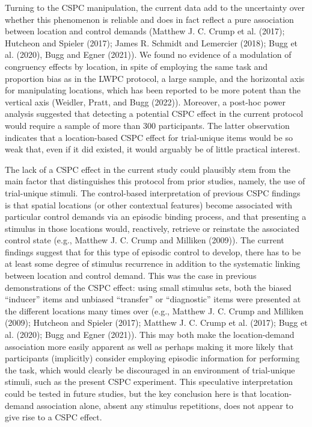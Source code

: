 \documentclass[
  ,man,floatsintext]{apa6}
\begin{document}
Turning to the CSPC manipulation, the current data add to the uncertainty over whether this phenomenon is reliable and does in fact reflect a pure association between location and control demands (Matthew J. C. Crump et al. (2017); Hutcheon and Spieler (2017); James R. Schmidt and Lemercier (2018); Bugg et al. (2020), Bugg and Egner (2021)). We found no evidence of a modulation of congruency effects by location, in spite of employing the same task and proportion bias as in the LWPC protocol, a large sample, and the horizontal axis for manipulating locations, which has been reported to be more potent than the vertical axis (Weidler, Pratt, and Bugg (2022)). Moreover, a post-hoc power analysis suggested that detecting a potential CSPC effect in the current protocol would require a sample of more than 300 participants. The latter observation indicates that a location-based CSPC effect for trial-unique items would be so weak that, even if it did existed, it would arguably be of little practical interest.

The lack of a CSPC effect in the current study could plausibly stem from the main factor that distinguishes this protocol from prior studies, namely, the use of trial-unique stimuli. The control-based interpretation of previous CSPC findings is that spatial locations (or other contextual features) become associated with particular control demands via an episodic binding process, and that presenting a stimulus in those locations would, reactively, retrieve or reinstate the associated control state (e.g., Matthew J. C. Crump and Milliken (2009)). The current findings suggest that for this type of episodic control to develop, there has to be at least some degree of stimulus recurrence in addition to the systematic linking between location and control demand. This was the case in previous demonstrations of the CSPC effect: using small stimulus sets, both the biased ``inducer'' items and unbiased ``transfer'' or ``diagnostic'' items were presented at the different locations many times over (e.g., Matthew J. C. Crump and Milliken (2009); Hutcheon and Spieler (2017); Matthew J. C. Crump et al. (2017); Bugg et al. (2020); Bugg and Egner (2021)). This may both make the location-demand association more easily apparent as well as perhaps making it more likely that participants (implicitly) consider employing episodic information for performing the task, which would clearly be discouraged in an environment of trial-unique stimuli, such as the present CSPC experiment. This speculative interpretation could be tested in future studies, but the key conclusion here is that location-demand association alone, absent any stimulus repetitions, does not appear to give rise to a CSPC effect.
\end{document}
